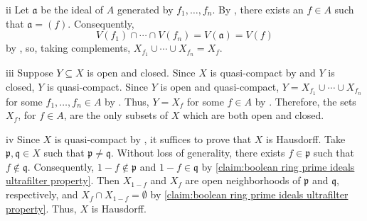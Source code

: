 \begin{partsolution}{ii}
Let \(\mathfrak{a}\) be the ideal of \(A\) generated by \(f_1, \ldots, f_n\).
By , there exists an \(f \in A\) such that \(\mathfrak{a} = (f)\).
Consequently,
\begin{equation*}
V(f_1) \cap \cdots \cap V(f_n)
= V(\mathfrak{a})
= V(f)
\end{equation*}
by , so, taking complements, \(X_{f_1} \cup \cdots \cup X_{f_n} = X_f\).
\end{partsolution}

\begin{partsolution}{iii}
Suppose \(Y \subseteq X\) is open and closed.
Since \(X\) is quasi-compact by  and \(Y\) is closed, \(Y\) is quasi-compact.
Since \(Y\) is open and quasi-compact, \(Y = X_{f_1} \cup \cdots \cup X_{f_n}\) for some \(f_1, \ldots, f_n \in A\) by .
Thus, \(Y = X_f\) for some \(f \in A\) by .
Therefore, the sets \(X_f\), for \(f \in A\), are the only subsets of \(X\) which are both open and closed.
\end{partsolution}

\begin{partsolution}{iv}
Since \(X\) is quasi-compact by , it suffices to prove that \(X\) is Hausdorff.
Take \(\mathfrak{p}, \mathfrak{q} \in X\) such that \(\mathfrak{p} \neq \mathfrak{q}\).
Without loss of generality, there exists \(f \in \mathfrak{p}\) such that \(f \notin \mathfrak{q}\).
Consequently, \(1 - f \notin \mathfrak{p}\) and \(1 - f \in \mathfrak{q}\) by \autoref{claim:boolean ring prime ideals ultrafilter property}.
Then \(X_{1-f}\) and \(X_f\) are open neighborhoods of \(\mathfrak{p}\) and \(\mathfrak{q}\), respectively, and \(X_f \cap X_{1 - f} = \emptyset\) by \autoref{claim:boolean ring prime ideals ultrafilter property}.
Thus, \(X\) is Hausdorff.
\end{partsolution}